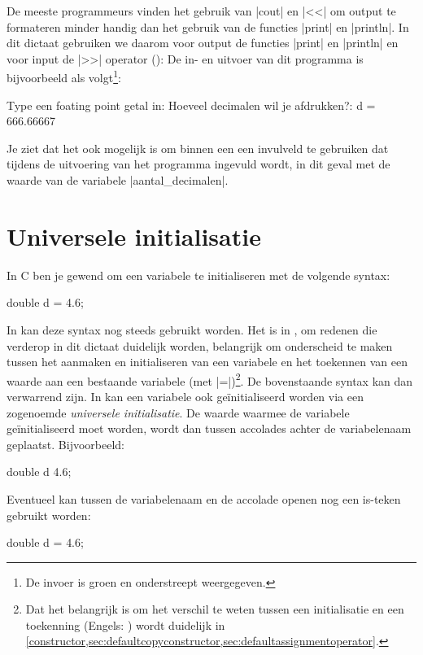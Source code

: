 \begin{cpplstShortInline}
De meeste programmeurs vinden het gebruik van |cout| en |<<| om output te formateren minder handig dan het gebruik van de functies |print| en |println|.
In dit dictaat gebruiken we daarom voor output de functies |print| en |println| en voor input de |>>| operator ():
\label{prog:lees_en_print_double}
De in- en uitvoer van dit programma is bijvoorbeeld als volgt\footnote{%
	De invoer is groen en onderstreept weergegeven.
}:
\begin{coutput}
Type een foating point getal in: 
Hoeveel decimalen wil je afdrukken?: 
d = 666.66667
\end{coutput}
Je ziet dat het ook mogelijk is om binnen een  een invulveld te gebruiken dat tijdens de uitvoering van het programma ingevuld wordt, in dit geval met de waarde van de variabele |aantal_decimalen|.

\section{Universele initialisatie}
\label{sec:universeleinitialisatie}	
In C ben je gewend om een variabele te initialiseren met de volgende syntax:
\begin{cpplstfragment}[style=cstyle]
	double d = 4.6;
\end{cpplstfragment}
In \Cpp{} kan deze syntax nog steeds gebruikt worden.
Het is in \Cpp{}, om redenen die verderop in dit dictaat duidelijk worden, belangrijk om onderscheid te maken tussen het aanmaken en initialiseren van een variabele en het toekennen van een waarde aan een bestaande variabele (met |=|)\footnote{%
	Dat het belangrijk is om het verschil te weten tussen een initialisatie en een toekenning (Engels: ) wordt duidelijk in \cref{constructor,sec:defaultcopyconstructor,sec:defaultassignmentoperator}.
}.
De bovenstaande syntax kan dan verwarrend zijn. 
In \Cpp{} kan een variabele ook geïnitialiseerd worden via een zogenoemde \emph{universele initialisatie}.
De waarde waarmee de variabele geïnitialiseerd moet worden, wordt dan tussen accolades achter de variabelenaam geplaatst.
Bijvoorbeeld:
\begin{cpplstfragment}
	double d {4.6};
\end{cpplstfragment}
Eventueel kan tussen de variabelenaam en de accolade openen nog een is-teken gebruikt worden:
\begin{cpplstfragment}
	double d = {4.6};
\end{cpplstfragment}


\end{cpplstShortInline}
